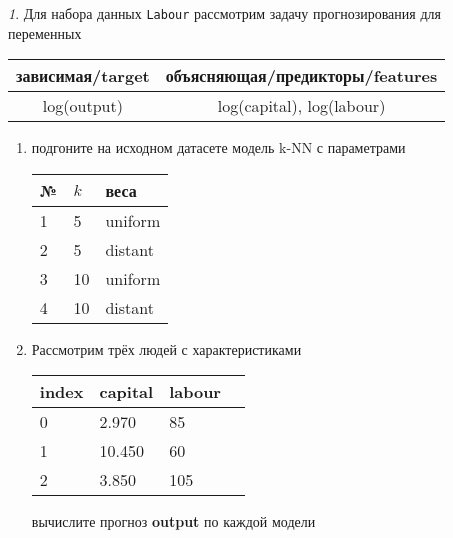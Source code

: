 \documentclass[12pt]{article}
\theoremstyle{remark}
\newtheorem{exercise}{}[section]
\begin{document}
\begin{exercise}
Для набора данных \texttt{Labour} рассмотрим задачу прогнозирования
для переменных
\begin{center}
	\begin{tabular}{|c|c|}\hline
		зависимая/target & объясняющая/предикторы/features \\ \hline
		log(output) & log(capital), log(labour) \\ \hline
	\end{tabular}
\end{center}
\begin{enumerate}
	\item подгоните на исходном датасете модель k-NN с параметрами
	\begin{center}
		\begin{tabular}{|l|l|l|}\hline
		№ & \(k\) & веса \\ \hline
		1 & 5 & uniform \\
		2 & 5 & distant \\
		3 & 10 & uniform \\
		4 & 10 & distant \\ \hline
		\end{tabular}
	\end{center}
	\item Рассмотрим трёх людей с характеристиками
	\begin{center}
		\begin{tabular}{|l||l||l|l|}\hline
			index & capital & labour \\ \hline\hline
			0 & 2.970 & 85 \\
			1 & 10.450 & 60  \\
			2 & 3.850 & 105 \\ \hline
		\end{tabular}
	\end{center}
	вычислите прогноз \textbf{output} по каждой модели
\end{enumerate}
\end{exercise}
\end{document}
